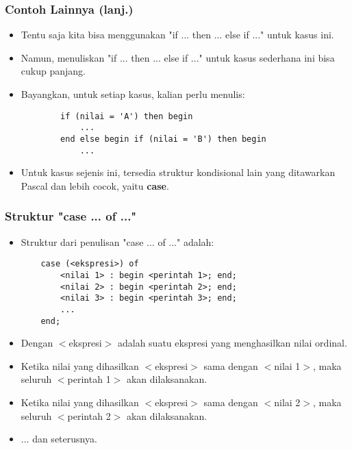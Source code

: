 \documentclass{beamer}
\begin{document}
\begin{frame}[fragile]
\frametitle{Contoh Lainnya (lanj.)}
\begin{itemize}
	\item Tentu saja kita bisa menggunakan "if ... then ... else if ..." untuk kasus ini.
	\item Namun, menuliskan "if ... then ... else if ..." untuk kasus sederhana ini bisa cukup panjang.
	\item Bayangkan, untuk setiap kasus, kalian perlu menulis:
	\begin{lstlisting}
		if (nilai = 'A') then begin
		    ...
		end else begin if (nilai = 'B') then begin
		    ...
	\end{lstlisting}	
	\item Untuk kasus sejenis ini, tersedia struktur kondisional lain yang ditawarkan Pascal dan lebih cocok, yaitu \alert{\textbf{case}}.
\end{itemize}
\end{frame}

\begin{frame}[fragile]
\frametitle{Struktur "case ... of ..."}
\begin{itemize}
	\item Struktur dari penulisan "case ... of ..." adalah:
	\begin{lstlisting}
	case (<ekspresi>) of
	    <nilai 1> : begin <perintah 1>; end;
	    <nilai 2> : begin <perintah 2>; end;
	    <nilai 3> : begin <perintah 3>; end;
	    ...
	end;
	\end{lstlisting}
	
	\item Dengan $<$ekspresi$>$ adalah suatu ekspresi yang menghasilkan \alert{nilai ordinal}.
	\item Ketika nilai yang dihasilkan $<$ekspresi$>$ sama dengan $<$nilai 1$>$, maka seluruh $<$perintah 1$>$ akan dilaksanakan.
	\item Ketika nilai yang dihasilkan $<$ekspresi$>$ sama dengan $<$nilai 2$>$, maka seluruh $<$perintah 2$>$ akan dilaksanakan.
	\item ... dan seterusnya.
\end{itemize}
\end{frame}
\end{document}
